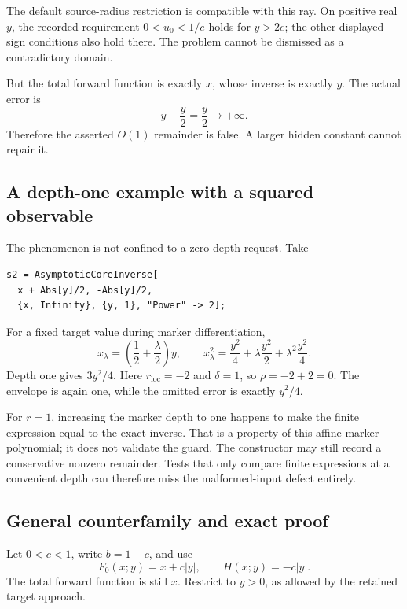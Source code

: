 \documentclass[11pt,letterpaper]{article}
\begin{document}
The default source-radius restriction is compatible with this ray. On positive real \(y\), the recorded requirement \(0<u_0<1/e\) holds for \(y>2e\); the other displayed sign conditions also hold there. The problem cannot be dismissed as a contradictory domain.

But the total forward function is exactly \(x\), whose inverse is exactly \(y\). The actual error is
\[
 y-\frac y2=\frac y2\longrightarrow+\infty.
\]
Therefore the asserted \(O(1)\) remainder is false. A larger hidden constant cannot repair it.

\subsection{A depth-one example with a squared observable}
The phenomenon is not confined to a zero-depth request. Take
\begin{lstlisting}
s2 = AsymptoticCoreInverse[
  x + Abs[y]/2, -Abs[y]/2,
  {x, Infinity}, {y, 1}, "Power" -> 2];
\end{lstlisting}
For a fixed target value during marker differentiation,
\[
 x_\lambda=\left(\frac12+\frac\lambda2\right)y,
 \qquad
 x_\lambda^2=\frac{y^2}{4}
            +\lambda\frac{y^2}{2}
            +\lambda^2\frac{y^2}{4}.
\]
Depth one gives \(3y^2/4\). Here \(r_{\mathrm{loc}}=-2\) and \(\delta=1\), so \(\rho=-2+2=0\). The envelope is again one, while the omitted error is exactly \(y^2/4\).

For \(r=1\), increasing the marker depth to one happens to make the finite expression equal to the exact inverse. That is a property of this affine marker polynomial; it does not validate the guard. The constructor may still record a conservative nonzero remainder. Tests that only compare finite expressions at a convenient depth can therefore miss the malformed-input defect entirely.

\subsection{General counterfamily and exact proof}
Let \(0<c<1\), write \(b=1-c\), and use
\[
 F_0(x;y)=x+c|y|,\qquad H(x;y)=-c|y|.
\]
The total forward function is still \(x\). Restrict to \(y>0\), as allowed by the retained target approach.
\end{document}
